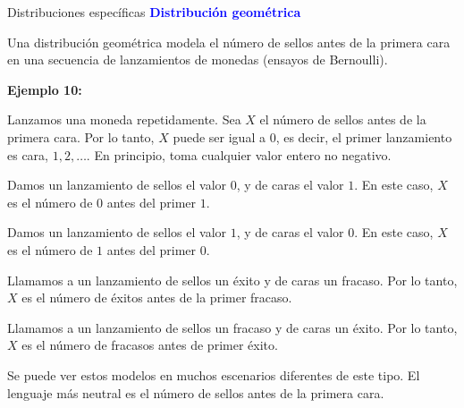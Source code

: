 \documentclass[10pt]{beamer}
\begin{document}
\begin{frame}{Distribuciones espec\'ificas}
\textbf{\textcolor{blue}{Distribuci\'on geom\'etrica}}

\small{Una distribuci\'on geom\'etrica modela el n\'umero de sellos antes de la primera cara en una secuencia de lanzamientos  de  monedas (ensayos de Bernoulli).
	
\vspace{0.2cm}

\textbf{Ejemplo 10:}
\begin{itemize}
\item \scriptsize{Lanzamos una moneda repetidamente. Sea $X$ el n\'umero de sellos antes de la primera cara. Por lo tanto, $X$ puede ser igual a $0$, es decir, el primer lanzamiento es cara, $1, 2, \dots$. En principio, toma cualquier valor entero no negativo.

\item Damos un lanzamiento de sellos el valor $0$, y de caras  el valor $1$. En este caso, $X$ es el n\'umero de $0$ antes del primer $1$.

\item Damos un lanzamiento de sellos el valor $1$, y de caras  el valor $0$. En este caso, $X$ es el n\'umero de $1$ antes del primer $0$.

\item Llamamos  a un lanzamiento  de sellos un \'exito y de caras un fracaso. Por lo tanto, $X$ es el n\'umero de \'exitos antes de la primer fracaso.

\item Llamamos  a un lanzamiento  de sellos un fracaso y de caras un \'exito. Por lo tanto, $X$ es el n\'umero de fracasos antes de primer \'exito.}
\end{itemize}

\vspace{0.2cm}

\small{Se puede ver estos modelos en muchos escenarios diferentes de este tipo. El lenguaje m\'as neutral es el n\'umero de sellos antes de la primera cara.}
	
}
\end{frame}
\end{document}
